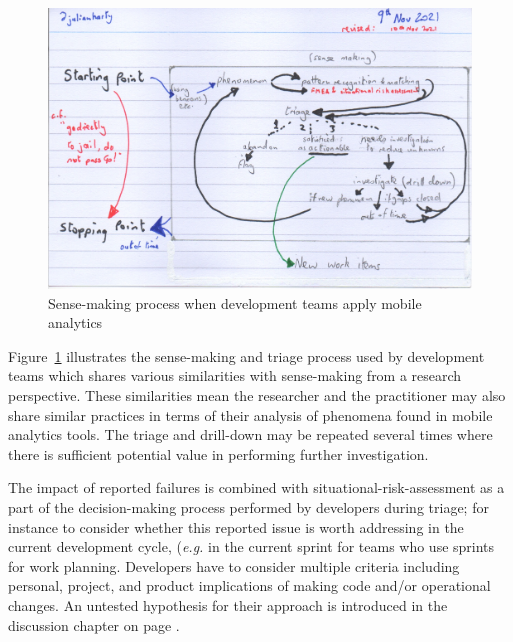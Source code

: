 \begin{figure}
    \centering
    \includegraphics[width=15cm]{images/rough-sketches/practical-sense-making-process-10-nov-2021.jpeg}
    \caption{Sense-making process when development teams apply mobile analytics}
    \label{fig:practical-sense-making-process-when-dev-teams-apply-mobile-analytics}
\end{figure}


Figure~\ref{fig:practical-sense-making-process-when-dev-teams-apply-mobile-analytics} illustrates the sense-making and triage process used by development teams which shares various similarities with sense-making from a research perspective. These similarities mean the researcher and the practitioner may also share similar practices in terms of their analysis of phenomena found in mobile analytics tools. The triage and drill-down may be repeated several times where there is sufficient potential value in performing further investigation. 

The impact of reported failures is combined with situational-risk-assessment as a part of the decision-making process performed by developers during triage; for instance to consider whether this reported issue is worth addressing in the current development cycle, (\textit{e.g.} in the current sprint for teams who use sprints for work planning. Developers have to consider multiple criteria including personal, project, and product implications of making code and/or operational changes. An untested hypothesis for their approach is introduced in the discussion chapter on page \pageref{discussion-decision-making-by-dev-teams-section}.


